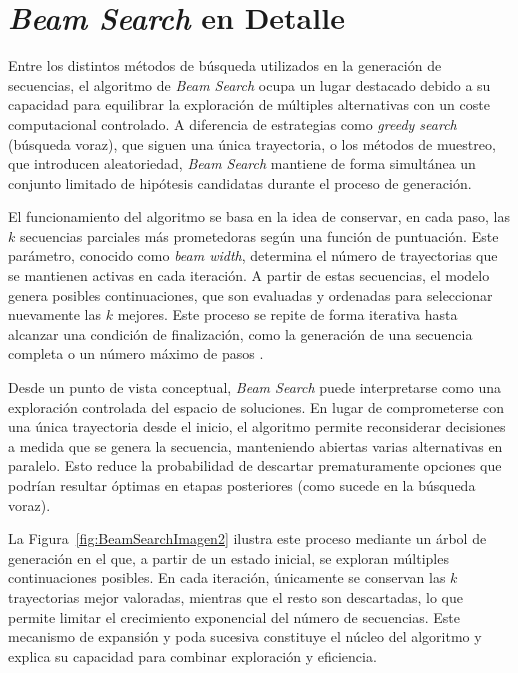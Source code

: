 \documentclass[12pt,a4paper,twoside,openright]{book}
\begin{document}
\section{\emph{Beam Search} en Detalle}

Entre los distintos métodos de búsqueda utilizados en la generación de secuencias, el algoritmo de \emph{Beam Search} ocupa un lugar destacado debido a su capacidad para equilibrar la exploración de múltiples alternativas con un coste
computacional controlado. A diferencia de estrategias como \emph{greedy search} (búsqueda voraz), que siguen una única trayectoria, o los métodos de muestreo, que introducen aleatoriedad, \emph{Beam Search} mantiene de forma simultánea un
conjunto limitado de hipótesis candidatas durante el proceso de generación.

El funcionamiento del algoritmo se basa en la idea de conservar, en cada paso, las $k$ secuencias parciales más prometedoras según una función de puntuación. Este parámetro, conocido como \emph{beam width}, determina el número de
trayectorias que se mantienen activas en cada iteración. A partir de estas secuencias, el modelo genera posibles continuaciones, que son evaluadas y ordenadas para seleccionar nuevamente las $k$ mejores. Este proceso se repite de forma
iterativa hasta alcanzar una condición de finalización, como la generación de una secuencia completa o un número máximo de pasos \cite{jurafsky2009speech}.

Desde un punto de vista conceptual, \emph{Beam Search} puede interpretarse como una exploración controlada del espacio de soluciones. En lugar de comprometerse con una única trayectoria desde el inicio, el algoritmo permite reconsiderar
decisiones a medida que se genera la secuencia, manteniendo abiertas varias alternativas en paralelo. Esto reduce la probabilidad de descartar prematuramente opciones que podrían resultar óptimas en etapas posteriores (como sucede en la
búsqueda voraz).

La Figura~\ref{fig:BeamSearchImagen2} ilustra este proceso mediante un árbol de generación en el que, a partir de un estado inicial, se exploran múltiples continuaciones posibles. En cada iteración, únicamente se conservan las $k$ trayectorias
mejor valoradas, mientras que el resto son descartadas, lo que permite limitar el crecimiento exponencial del número de secuencias. Este mecanismo de expansión y poda sucesiva constituye el núcleo del algoritmo y explica su capacidad para
combinar exploración y eficiencia.
\end{document}
